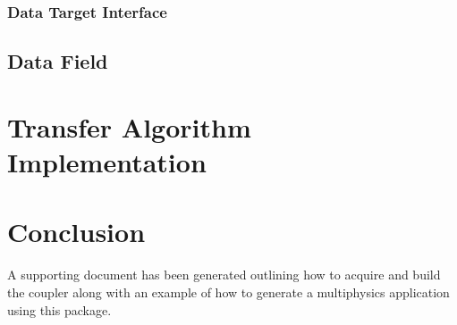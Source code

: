 \documentclass[letterpaper]{article}
\begin{document}
\subsubsection{Data Target Interface}

\subsection{Data Field}

\section{Transfer Algorithm Implementation}

\section{Conclusion}

A supporting document has been generated outlining how to acquire and
build the coupler along with an example of how to generate a
multiphysics application using this package.

\pagebreak


\end{document}
